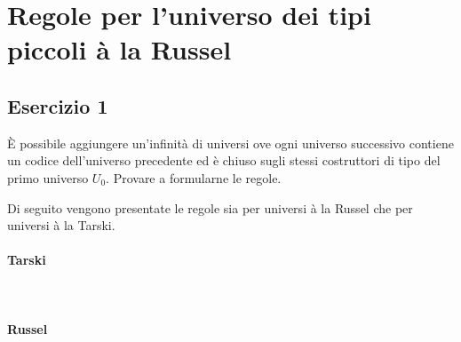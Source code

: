 \section{Regole per l’universo dei tipi piccoli à la Russel}
\subsection{Esercizio 1}
\begin{thm} 
	\`E possibile aggiungere un'infinità di universi ove ogni universo successivo contiene un codice dell'universo precedente ed è chiuso sugli stessi costruttori di tipo del primo universo $U_0$. Provare a formularne le regole.
\end{thm}
Di seguito vengono presentate le regole sia per universi à la Russel che per universi à la Tarski.

\paragraph{Tarski} \mbox{} \\


\paragraph{Russel} \mbox{} \\
